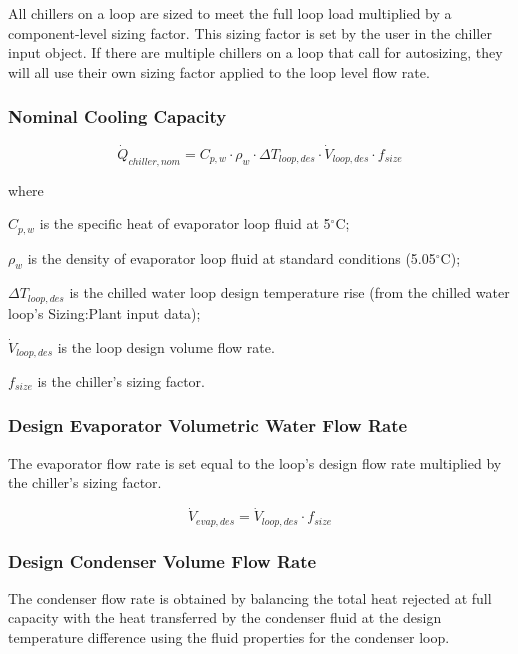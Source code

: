 All chillers on a loop are sized to meet the full loop load multiplied by a component-level sizing factor.  This sizing factor is set by the user in the chiller input object. If there are multiple chillers on a loop that call for autosizing, they will all use their own sizing factor applied to the loop level flow rate.

\subsubsection{Nominal Cooling Capacity}\label{nominal-cooling-capacity}

\begin{equation}
\dot Q_{chiller,nom} = C_{p,w} \cdot \rho_w \cdot \Delta T_{loop,des} \cdot \dot V_{loop,des} \cdot f_{size}
\end{equation}

where

\( C_{p,w} \) is the specific heat of evaporator loop fluid at 5\(^{\circ}\)C;

\( \rho_w \) is the density of evaporator loop fluid at standard conditions (5.05\(^{\circ}\)C);

\( \Delta T_{loop,des} \) is the chilled water loop design temperature rise (from the chilled water loop's Sizing:Plant input data);

\( \dot V_{loop,des} \) is the loop design volume flow rate.

\( f_{size} \) is the chiller's sizing factor.

\subsubsection{Design Evaporator Volumetric Water Flow Rate}\label{design-evaporator-volumetric-water-flow-rate}

The evaporator flow rate is set equal to the loop's design flow rate multiplied by the chiller's sizing factor.

\begin{equation}
\dot V_{evap,des} = \dot V_{loop,des} \cdot f_{size}
\end{equation}

\subsubsection{Design Condenser Volume Flow Rate}\label{design-condenser-volume-flow-rate}

The condenser flow rate is obtained by balancing the total heat rejected at full capacity with the heat transferred by the condenser fluid at the design temperature difference using the fluid properties for the condenser loop.

